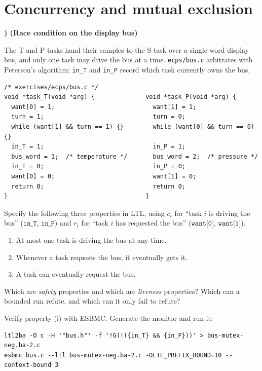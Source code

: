 \documentclass[11pt,a4paper]{article}
\newcommand{\esbmc}{ESBMC}
\newcommand{\file}[1]{\texttt{\small #1}}
\newcounter{exc}
\newenvironment{exercise}[1]
  {\stepcounter{exc}\medskip\noindent\textbf{\theexc) (#1)}\par\nopagebreak\smallskip}
  {\par\medskip}
\begin{document}
\section{Concurrency and mutual exclusion}

\begin{exercise}{Race condition on the display bus}
The T and P tasks hand their samples to the S task over a single-word display
bus, and only one task may drive the bus at a time. \file{ecps/bus.c}
arbitrates with Peterson's algorithm; \texttt{in\_T} and \texttt{in\_P} record
which task currently owns the bus.

\begin{lstlisting}
/* exercises/ecps/bus.c */
void *task_T(void *arg) {              void *task_P(void *arg) {
  want[0] = 1;                           want[1] = 1;
  turn = 1;                              turn = 0;
  while (want[1] && turn == 1) {}        while (want[0] && turn == 0) {}
  in_T = 1;                              in_P = 1;
  bus_word = 1;  /* temperature */       bus_word = 2;  /* pressure */
  in_T = 0;                              in_P = 0;
  want[0] = 0;                           want[1] = 0;
  return 0;                              return 0;
}                                      }
\end{lstlisting}

\begin{parts}
  \item Specify the following three properties in LTL, using $c_i$ for ``task
        $i$ is driving the bus'' ($\texttt{in\_T}$, $\texttt{in\_P}$) and $r_i$
        for ``task $i$ has requested the bus'' ($\texttt{want[0]}$,
        $\texttt{want[1]}$).
        \begin{enumerate}[label=\roman*.,leftmargin=2.2em,topsep=2pt]
          \item At most one task is driving the bus at any time.
          \item Whenever a task requests the bus, it eventually gets it.
          \item A task can eventually request the bus.
        \end{enumerate}
  \item Which are \emph{safety} properties and which are \emph{liveness}
        properties? Which can a bounded run refute, and which can it only fail
        to refute?
  \item Verify property (i) with \esbmc{}. Generate the monitor and run it:

\begin{lstlisting}[style=sh]
ltl2ba -O c -H '"bus.h"' -f '!G(!({in_T} && {in_P}))' > bus-mutex-neg.ba-2.c
esbmc bus.c --ltl bus-mutex-neg.ba-2.c -DLTL_PREFIX_BOUND=10 --context-bound 3
\end{lstlisting}


\end{parts}
\end{exercise}
\end{document}
